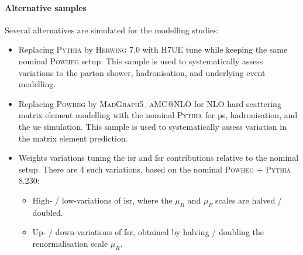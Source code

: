 \paragraph{Alternative samples} Several alternatives are simulated for the modelling studies:
\begin{itemize}
  \item Replacing \textsc{Pythia} by \textsc{Herwing} 7.0 with H7UE tune \cite{herwig7R} while keeping the same nominal \textsc{Powheg} setup. This sample is used to systematically assess variations to the parton shower, hadronisation, and underlying event modelling.
  \item Replacing \textsc{Powheg} by \textsc{MadGraph5\_aMC@NLO} \cite{madgraph} for NLO hard scattering matrix element modelling with the nominal \textsc{Pythia} for \gls{ps}, hadronisation, and the \gls{ue} simulation. This sample is used to systematically assess variation in the matrix element prediction.
  \item Weights variations tuning the \gls{isr} and \gls{fsr} contributions relative to the nominal setup. There are 4 such variations, based on the nominal \textsc{Powheg} + \textsc{Pythia} 8.230:
  \begin{itemize}
    \item High- / low-variations of \gls{isr}, where the $\mu_R$ and $\mu_F$ scales are halved / doubled. %
    \item Up- / down-variations of \gls{fsr}, obtained by halving / doubling the renormalisation scale $\mu_{R}$. 
  \end{itemize}
\end{itemize} 

